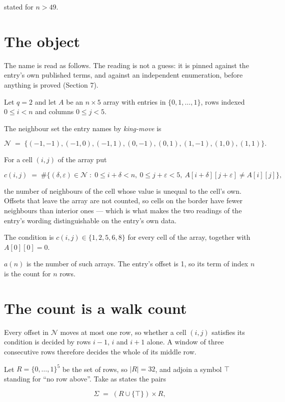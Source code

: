\documentclass[11pt]{article}
\theoremstyle{definition}
\begin{document}
stated for $n > 49$.

\section{The object}

The name is read as follows. The reading is not a guess: it is pinned against the entry's own published terms, and against an independent enumeration, before anything is proved (Section 7).

Let $q = 2$ and let $A$ be an $n \times 5$ array with entries in $\{0,1,\dots,1\}$, rows indexed $0 \le i < n$ and columns $0 \le j < 5$.

The neighbour set the entry names by {\itshape king-move} is

\[\mathcal{N} \;=\; \{(-1,-1), (-1,0), (-1,1), (0,-1), (0,1), (1,-1), (1,0), (1,1)\}.\]

For a cell $(i,j)$ of the array put

\[c(i,j) \;=\; \#\bigl\{(\delta,\varepsilon)\in\mathcal{N} \;:\; 0\le i+\delta<n,\ 0\le j+\varepsilon<5,\ A[i+\delta][j+\varepsilon] \neq A[i][j]\bigr\},\]

the number of neighbours of the cell whose value is unequal to the cell's own. Offsets that leave the array are not counted, so cells on the border have fewer neighbours than interior ones --- which is what makes the two readings of the entry's wording distinguishable on the entry's own data.

The condition is $c(i,j) \in \{1, 2, 5, 6, 8\}$ for every cell of the array, together with $A[0][0]=0$.

$a(n)$ is the number of such arrays. The entry's offset is 1, so its term of index $n$ is the count for $n$ rows.

\section{The count is a walk count}

Every offset in $\mathcal{N}$ moves at most one row, so whether a cell $(i,j)$ satisfies its condition is decided by rows $i-1$, $i$ and $i+1$ alone. A window of three consecutive rows therefore decides the whole of its middle row.

Let $R = \{0,\dots,1\}^{5}$ be the set of rows, so $|R| = 32$, and adjoin a symbol $\top$ standing for ``no row above''. Take as states the pairs

\[\Sigma \;=\; (R \cup \{\top\}) \times R,\]
\end{document}

